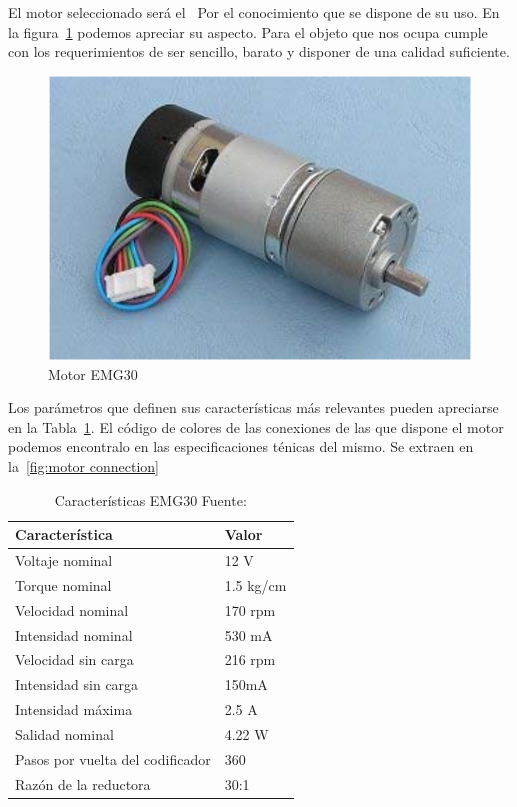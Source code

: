 
El motor seleccionado será el~\cite{EMG30datasheet} Por el conocimiento que se dispone de su uso. En la figura~\cref{fig:EMG Motor} podemos apreciar su aspecto. Para el objeto que nos ocupa cumple con los requerimientos de ser sencillo, barato y disponer de una calidad suficiente.

\begin{figure}[H]
    \centering
    \includegraphics[scale = 0.4]{part/Proyecto_ejecutivo/memoria_constructiva/motor/img/MotorEMG30}
    \caption{Motor EMG30\cite{EMG30datasheet}}\label{fig:EMG Motor}
\end{figure}

Los parámetros que definen sus características más relevantes pueden apreciarse en la Tabla~\ref{tab:EMG30specifications}. El código de colores de las conexiones de las que dispone el motor podemos encontralo en las especificaciones ténicas del mismo. Se extraen en la~\cref{fig:motor connection}


\begin{table}[H]
    \centering
    \begin{tabular}{|l|l|}
        \hline
        Característica & Valor\\
        \hline
        Voltaje nominal & 12 V\\
        \hline
        Torque nominal & 1.5 kg/cm\\
        \hline
        Velocidad nominal & 170 rpm\\
        \hline
        Intensidad nominal & 530 mA\\
        \hline
        Velocidad sin carga& 216 rpm\\
        \hline
        Intensidad sin carga& 150mA\\
        \hline
        Intensidad máxima& 2.5 A\\
        \hline
        Salidad nominal & 4.22 W\\
        \hline
        Pasos por vuelta del codificador& 360 \\
        \hline
        Razón de la reductora & 30:1\\
        \hline
    \end{tabular}
    \caption{Características EMG30 Fuente:\cite{EMG30datasheet}}\label{tab:EMG30specifications}
\end{table}


